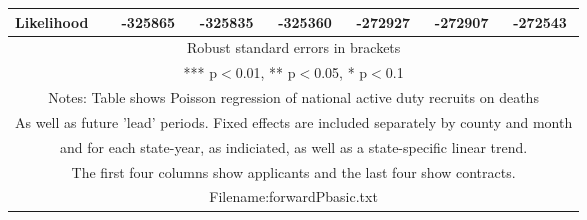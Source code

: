 \documentclass[]{article}
\begin{document}
\begin{tabular}{lcccccc}
 Likelihood & -325865 & -325835 & -325360 & -272927 & -272907 & -272543 \\ \hline
\multicolumn{7}{c}{ Robust standard errors in brackets} \\
\multicolumn{7}{c}{ *** p$<$0.01, ** p$<$0.05, * p$<$0.1} \\
\multicolumn{7}{c}{ Notes: Table shows Poisson regression of national active duty recruits on deaths} \\
\multicolumn{7}{c}{ As well as future 'lead' periods. Fixed effects are included separately by county and month} \\
\multicolumn{7}{c}{ and for each state-year, as indiciated, as well as a state-specific linear trend.} \\
\multicolumn{7}{c}{ The first four columns show applicants and the last four show contracts.} \\
\multicolumn{7}{c}{ Filename:forwardPbasic.txt} \\
\end{tabular}
\end{document}
